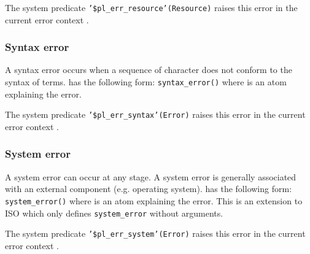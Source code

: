 The system predicate \texttt{'\$pl\_err\_resource'(Resource)} raises this
error in the current error context .

\subsubsection{Syntax error}
\label{Syntax-error}
A syntax error occurs when a sequence of character does not conform to the
syntax of terms.  has the following form:
\texttt{syntax\_error()} where  is an
atom explaining the error.

The system predicate \texttt{'\$pl\_err\_syntax'(Error)} raises this
error in the current error context .

\subsubsection{System error}
A system error can occur at any stage. A system error is generally
associated with an external component (e.g. operating system).
 has the following form:
\texttt{system\_error()} where  is an
atom explaining the error. This is an extension to ISO which only defines
\texttt{system\_error} without arguments.

The system predicate \texttt{'\$pl\_err\_system'(Error)} raises this
error in the current error context .

